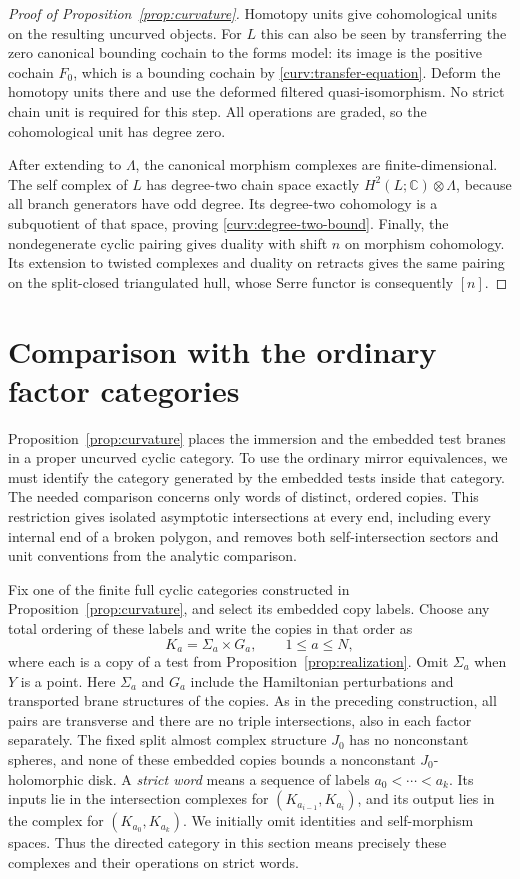 \documentclass[11pt]{article}
\numberwithin{equation}{section}
\theoremstyle{definition}
\theoremstyle{remark}
\begin{document}
\begin{proof}[Proof of Proposition~\ref{prop:curvature}]
Homotopy units give cohomological units on the resulting uncurved
objects.  For $L$ this can also be seen by transferring the zero
canonical bounding cochain to the forms model: its image is the
positive cochain $F_0$, which is a bounding cochain by
\eqref{curv:transfer-equation}.  Deform the homotopy units there and
use the deformed filtered quasi-isomorphism.  No strict chain unit
is required for this step.  All operations are graded, so the
cohomological unit has degree zero.

After extending to $\Lambda$, the canonical morphism complexes are
finite-dimensional.  The self complex of $L$ has degree-two chain
space exactly $H^2(L;\mathbb C)\otimes\Lambda$, because all branch
generators have odd degree.  Its degree-two cohomology is a
subquotient of that space, proving \eqref{curv:degree-two-bound}.
Finally, the nondegenerate cyclic pairing gives duality with shift
$n$ on morphism cohomology.  Its extension to twisted complexes and
duality on retracts gives the same pairing on the split-closed
triangulated hull, whose Serre functor is consequently $[n]$.
\end{proof}

\section{Comparison with the ordinary factor categories}
\label{sec:comparison}

Proposition~\ref{prop:curvature} places the immersion and the embedded
test branes in a proper uncurved cyclic category.  To use the ordinary
mirror equivalences, we must identify the category generated by the
embedded tests inside that category.  The needed comparison concerns
only words of distinct, ordered copies.  This restriction gives isolated
asymptotic intersections at every end, including every internal end of a
broken polygon, and removes both self-intersection sectors and unit
conventions from the analytic comparison.

Fix one of the finite full cyclic categories constructed in
Proposition~\ref{prop:curvature}, and select its embedded copy labels.
Choose any total ordering of these labels and write the copies in that
order as
\[
 K_a=\Sigma_a\times G_a,\qquad 1\leq a\leq N,
\]
where each is a copy of a test from Proposition~\ref{prop:realization}.
Omit $\Sigma_a$ when $Y$ is a point.  Here $\Sigma_a$ and $G_a$ include the Hamiltonian
perturbations and transported brane structures of the copies.  As in
the preceding construction, all pairs are transverse and there are no
triple intersections, also in each factor separately.  The fixed split
almost complex structure $J_0$ has no nonconstant spheres, and none of
these embedded copies bounds a nonconstant $J_0$-holomorphic disk.
A \emph{strict word} means a sequence of labels
$a_0<\cdots<a_k$.  Its inputs lie in the intersection complexes for
$(K_{a_{i-1}},K_{a_i})$, and its output lies in the complex for
$(K_{a_0},K_{a_k})$.  We initially omit identities and self-morphism
spaces.  Thus the directed category in this section means precisely
these complexes and their operations on strict words.
\end{document}
